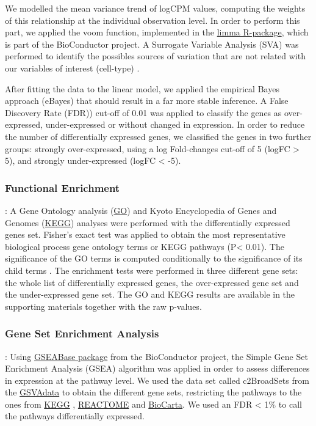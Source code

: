 \documentclass[9pt,twocolumn,twoside]{gsajnl}
\begin{document}
We modelled the mean variance trend of logCPM values, computing the weights of this relationship at the individual observation level. In order to perform this part, we applied the voom function, implemented in the \href{https://bioconductor.org/packages/release/bioc/html/limma.html}{limma R-package}, which is part of the BioConductor project. A Surrogate Variable Analysis (SVA) was performed to identify the possibles sources of variation that are not related with our variables of interest (cell-type)  \citep{Leek2007}.

After fitting the data to the linear model, we applied the empirical Bayes approach (eBayes) that should result in a far more stable inference. A False Discovery Rate (FDR)) \citep{Benjamini1995} cut-off of 0.01 was applied to classify the genes as over-expressed, under-expressed or without changed in expression. In order to reduce the number of differentially expressed genes, we classified the genes in two further groups: strongly over-expressed, using a log Fold-changes cut-off of 5 (logFC > 5), and strongly under-expressed (logFC < -5). 

\subsubsection*{Functional Enrichment}
: A Gene Ontology analysis (\href{http://geneontology.org}{GO}) and Kyoto Encyclopedia of Genes and Genomes (\href{http://www.genome.jp/kegg/}{KEGG}) analyses were performed with the differentially expressed genes set. Fisher's exact test \citep{Fisher1922} was applied to obtain the most representative biological process gene ontology terms or KEGG pathways (P< 0.01). The significance of the GO terms is computed conditionally to the significance of its child terms \citep{Alexa2006}. The enrichment tests were performed in three different gene sets: the whole list of differentially expressed genes, the over-expressed gene set and the under-expressed gene set. The GO and KEGG results are available in the supporting materials together with the raw p-values.

\subsubsection*{Gene Set Enrichment Analysis}
:  Using \href{http://bioconductor.org/packages/release/bioc/html/GSEABase.html}{GSEABase package} from the BioConductor project, the Simple Gene Set Enrichment Analysis (GSEA) algorithm \citep{Subramanian2005, Irizarry2009} was applied in order to assess differences in  expression at the pathway level. We used the data set called c2BroadSets from the \href{https://bioconductor.org/packages/release/data/experiment/html/GSVAdata.html}{GSVAdata} to obtain the different gene sets, restricting the pathways to the ones from \href{http://www.genome.jp/kegg/}{KEGG} , \href{http://www.reactome.org}{REACTOME} and \href{http://www.genecarta.com}{BioCarta}. We used an FDR < 1\% to call the pathways differentially expressed.
\end{document}
